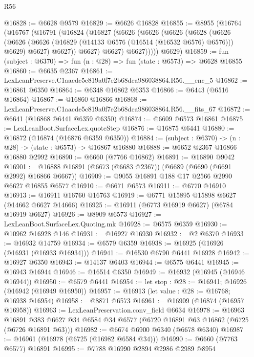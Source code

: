 \begin{lexlean}{R56}
\begin{coremodule}
@16828 := @6628 @9579
@16829 := @6626 @16828
@16855 := @8955
    (@16764
      (@16767
        (@16791
          (@16824
            (@16827
              (@6626
                (@6626
                  (@6626
                    (@6628
                      (@6626
                        (@6626
                          (@6626 (@16829 (@14133 @6576 (@16514 (@16532 @6576) @6576))) @6629)
                          @6627)
                        @6627))
                    @6627)
                  @6627)
                @6627)))))
      @6629)
@16859 := fun (subject : @6370) => fun (n : @28) => fun (state : @6573) => @6628 @16855
@16860 := @6635 @2367
@16861 := LexLeanPreserve.C1aacde5c819a0f7e2b68dca986038864.R56.__enc_5
@16862 := @16861 @6350
@16864 := @6348 @16862 @6353
@16866 := @6443 (@6516 @16864)
@16867 := @16860 @16866
@16868 := LexLeanPreserve.C1aacde5c819a0f7e2b68dca986038864.R56.__fits_67
@16872 := @6641 (@16868 @6441 @6359 @6350)
@16874 := @6609 @6573 @16861
@16875 := LexLeanBoot.SurfaceLex.quoteStep
@16876 := @16875 @6441
@16880 := @16872 (@16874 (@16876 @6359 @6350))
@16884 := (subject : @6370) -> (n : @28) -> (state : @6573) -> @16867 @16880
@16888 := @6652 @2367 @16866 @16880 @2992
@16890 := @6660 (@7766 @16862)
@16891 := @16890 @9042
@16901 := @16888 @16891 (@6673 (@6683 @2367)) (@6689 (@6690 (@6691 @2992) @16866 @6667))
@16909 := @9055 @16891 @188 @17 @2566 @2990 @6627 @16855 @6577
@16910 := @6671 @6573
@16911 := @6770 @16910
@16913 := @16911 @16760 @16763
@16919 := @6771 @15895 @15898 @6627 (@14662 @6627 @14666)
@16925 := @16911 (@6773 @16919 @6627) (@6784 @16919 @6627)
@16926 := @8909 @6573
@16927 := LexLeanBoot.SurfaceLex.Quoting.mk
@16928 := @6575 @6359
@16930 := @10962 @16928 @146
@16931 := @16927 @16930
@16932 := @2 @6370
@16933 := @16932 @14759
@16934 := @6579 @6359
@16938 := @16925 (@16926 (@16931 (@16933 @16934)))
@16941 := @16530 @6790 @6441 @16928
@16942 := @16927 @6350
@16943 := @14137 @6403
@16944 := @6575 @6441
@16945 := @16943 @16944
@16946 := @16514 @6350
@16949 := @16932 (@16945 (@16946 @16944))
@16950 := @6579 @6441
@16954 := let stop : @28 := @16941; @16926 (@16942 (@16949 @16950))
@16957 := @16913 (let value : @28 := @16768; @16938 @16954)
@16958 := @8871 @6573
@16961 := @16909 (@16874 (@16957 @16958))
@16963 := LexLeanPreservation.conv_field @6634
@16978 := @16963
    @16891
    @383
    @6627
    @34
    @6584
    @34
    @6577
    (@6720 @16891 @63 @16862 (@6725 (@6726 @16891 @63)))
@16982 := @6674 @6900 @6340 (@6678 @6340)
@16987 := @16961 (@16978 (@6725 (@16982 @6584 @34)))
@16990 := @6660 (@7763 @6577) @16891
@16995 := @7788 @16990 @2894 @2986 @2989 @8954

\end{coremodule}
\end{lexlean}
